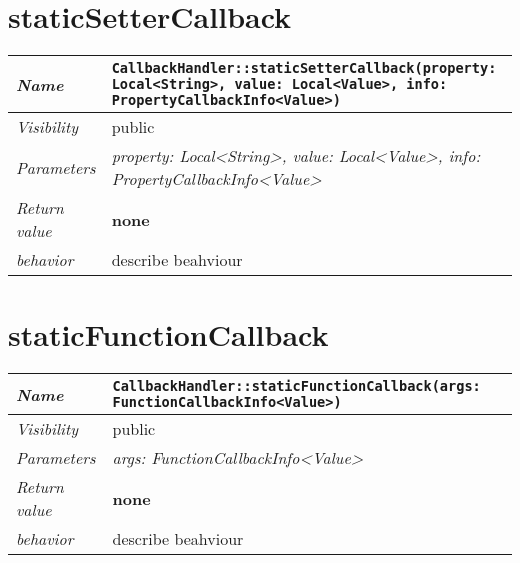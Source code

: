  \section{staticSetterCallback}
\begin{longtable}{p{3cm} @{\hskip 1cm} p{12cm}}
 \hline
\textit{Name} & \texttt{CallbackHandler::staticSetterCallback(property: Local<String>, value: Local<Value>, info: PropertyCallbackInfo<Value>)}\\
\hline
 \textit{Visibility} & public\\
\hline
\textit{Parameters} & \textit{property: Local<String>, value: Local<Value>, info: PropertyCallbackInfo<Value>}\\
\hline
\textit{Return value} & \textbf{none}\\
  \hline
 \textit{behavior} & describe beahviour \\
\hline
\end{longtable} \pagebreak
 \section{staticFunctionCallback}
\begin{longtable}{p{3cm} @{\hskip 1cm} p{12cm}}
 \hline
\textit{Name} & \texttt{CallbackHandler::staticFunctionCallback(args: FunctionCallbackInfo<Value>)}\\
\hline
 \textit{Visibility} & public\\
\hline
\textit{Parameters} & \textit{args: FunctionCallbackInfo<Value>}\\
\hline
\textit{Return value} & \textbf{none}\\
  \hline
 \textit{behavior} & describe beahviour \\
\hline
\end{longtable} \pagebreak
 